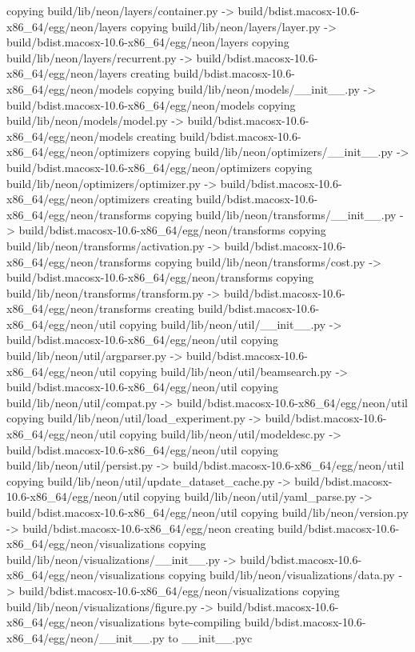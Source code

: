 copying build/lib/neon/layers/container.py -> build/bdist.macosx-10.6-x86_64/egg/neon/layers
copying build/lib/neon/layers/layer.py -> build/bdist.macosx-10.6-x86_64/egg/neon/layers
copying build/lib/neon/layers/recurrent.py -> build/bdist.macosx-10.6-x86_64/egg/neon/layers
creating build/bdist.macosx-10.6-x86_64/egg/neon/models
copying build/lib/neon/models/__init__.py -> build/bdist.macosx-10.6-x86_64/egg/neon/models
copying build/lib/neon/models/model.py -> build/bdist.macosx-10.6-x86_64/egg/neon/models
creating build/bdist.macosx-10.6-x86_64/egg/neon/optimizers
copying build/lib/neon/optimizers/__init__.py -> build/bdist.macosx-10.6-x86_64/egg/neon/optimizers
copying build/lib/neon/optimizers/optimizer.py -> build/bdist.macosx-10.6-x86_64/egg/neon/optimizers
creating build/bdist.macosx-10.6-x86_64/egg/neon/transforms
copying build/lib/neon/transforms/__init__.py -> build/bdist.macosx-10.6-x86_64/egg/neon/transforms
copying build/lib/neon/transforms/activation.py -> build/bdist.macosx-10.6-x86_64/egg/neon/transforms
copying build/lib/neon/transforms/cost.py -> build/bdist.macosx-10.6-x86_64/egg/neon/transforms
copying build/lib/neon/transforms/transform.py -> build/bdist.macosx-10.6-x86_64/egg/neon/transforms
creating build/bdist.macosx-10.6-x86_64/egg/neon/util
copying build/lib/neon/util/__init__.py -> build/bdist.macosx-10.6-x86_64/egg/neon/util
copying build/lib/neon/util/argparser.py -> build/bdist.macosx-10.6-x86_64/egg/neon/util
copying build/lib/neon/util/beamsearch.py -> build/bdist.macosx-10.6-x86_64/egg/neon/util
copying build/lib/neon/util/compat.py -> build/bdist.macosx-10.6-x86_64/egg/neon/util
copying build/lib/neon/util/load_experiment.py -> build/bdist.macosx-10.6-x86_64/egg/neon/util
copying build/lib/neon/util/modeldesc.py -> build/bdist.macosx-10.6-x86_64/egg/neon/util
copying build/lib/neon/util/persist.py -> build/bdist.macosx-10.6-x86_64/egg/neon/util
copying build/lib/neon/util/update_dataset_cache.py -> build/bdist.macosx-10.6-x86_64/egg/neon/util
copying build/lib/neon/util/yaml_parse.py -> build/bdist.macosx-10.6-x86_64/egg/neon/util
copying build/lib/neon/version.py -> build/bdist.macosx-10.6-x86_64/egg/neon
creating build/bdist.macosx-10.6-x86_64/egg/neon/visualizations
copying build/lib/neon/visualizations/__init__.py -> build/bdist.macosx-10.6-x86_64/egg/neon/visualizations
copying build/lib/neon/visualizations/data.py -> build/bdist.macosx-10.6-x86_64/egg/neon/visualizations
copying build/lib/neon/visualizations/figure.py -> build/bdist.macosx-10.6-x86_64/egg/neon/visualizations
byte-compiling build/bdist.macosx-10.6-x86_64/egg/neon/__init__.py to __init__.pyc
